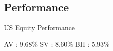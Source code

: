 \documentclass{beamer}
\begin{document}
\subsection{Performance}
%
\begin{frame}{US Equity Performance}
	\begin{figure}
		\resizebox{11cm}{6.5cm}{}
	\end{figure}
	\centering
	AV : 9.68\%  SV : 8.60\%  BH : 5.93\%
\end{frame}
\end{document}
